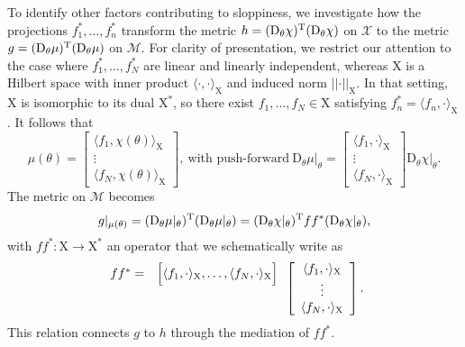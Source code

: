 \documentclass{article}
\newcommand{\D}{\mathrm{D}}
\newcommand{\norm}[1]{\vert\vert#1\vert\vert}
\newcommand{\p}{\theta}
\newcommand{\fmr}{\chi}
\newcommand{\fmm}{\mathcal{X}}
\newcommand{\omr}{\mu}
\newcommand{\omm}{\mathcal{M}}
\newcommand{\fms}{\mathrm{X}}
\begin{document}
To identify other factors contributing to sloppiness, we investigate
how the projections $f^*_1,\ldots,f^*_n$ transform the metric
$h = (\D_\p\fmr)^{\rm T}(\D_\p\fmr)$ on $\fmm$ to the metric
$g = (\D_\p\omr)^{\rm T}(\D_\p\omr)$ on $\omm$.  For clarity of
presentation, we restrict our attention to the case where
$f^*_1,\ldots,f^*_N$ are linear and linearly independent, whereas
$\fms$ is a Hilbert space with inner product
$\langle\cdot,\cdot\rangle_\fms$ and induced norm $\norm{\cdot}_\fms$.
In that setting, $\fms$ is isomorphic to its dual $\fms^*$, so there
exist $f_1,\ldots,f_N \in \fms$ satisfying
$f^*_n = \langle f_n,\cdot \rangle_\fms$.  It follows that
%
\[
 \omr(\p)
=
\left[\begin{array}{c}
 \langle f_1,\fmr(\p) \rangle_\fms
\\
\vdots
\\
 \langle f_N,\fmr(\p) \rangle_\fms
\end{array}\right] ,
\ \mbox{with push-forward} \
 \D_\p\omr\vert_\p
=
\left[\begin{array}{c}
 \langle f_1,\cdot\rangle_\fms
\\
\vdots
\\
 \langle f_N,\cdot \rangle_\fms
\end{array}\right]
 \D_\p\fmr\vert_\p .
\]
%
The metric on $\omm$ becomes
%
\[
 g\vert_{\omr(\p)}
=
 (\D_\p\omr\vert_\p)^{\rm T}
 (\D_\p\omr\vert_\p)
=
 (\D_\p\fmr\vert_\p)^{\rm T}
 f f^*
 (\D_\p\fmr\vert_\p) ,
\] 
%
with $f f^* : \fms \to \fms^*$ an operator
that we schematically write as
%
\[
\begin{array}{c}
 f f^*
=
\\
\vspace*{4mm}
\end{array}
\begin{array}{c}
\Big[
 \langle f_1,\cdot\rangle_\fms
,
 \ldots
,
 \langle f_N,\cdot\rangle_\fms
\Big]
\\
\vspace*{4mm}
\end{array}
%
\left[\begin{array}{c}
 \langle f_1,\cdot\rangle_\fms
\\
 \vdots
\\
 \langle f_N,\cdot\rangle_\fms
\end{array}\right] .
\]
%
This relation connects $g$ to $h$
through the mediation of $f f^*$.\\
\end{document}
